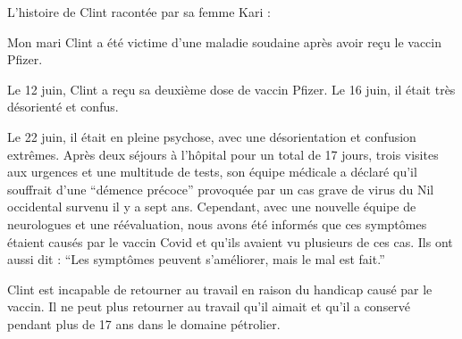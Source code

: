 L'histoire de Clint racontée par sa femme Kari :

Mon mari Clint a été victime d'une maladie soudaine après avoir reçu le vaccin
Pfizer.

Le 12 juin, Clint a reçu sa deuxième dose de vaccin Pfizer. Le 16 juin, il était
très désorienté et confus.

Le 22 juin, il était en pleine psychose, avec une désorientation et confusion
extrêmes. Après deux séjours à l'hôpital pour un total de 17 jours, trois
visites aux urgences et une multitude de tests, son équipe médicale a déclaré
qu'il souffrait d'une “démence précoce” provoquée par un cas grave de virus du
Nil occidental survenu il y a sept ans. Cependant, avec une nouvelle équipe de
neurologues et une réévaluation, nous avons été informés que ces symptômes
étaient causés par le vaccin Covid et qu'ils avaient vu plusieurs de ces
cas. Ils ont aussi dit : “Les symptômes peuvent s'améliorer, mais le mal est
fait.”

Clint est incapable de retourner au travail en raison du handicap causé par le
vaccin. Il ne peut plus retourner au travail qu'il aimait et qu'il a conservé
pendant plus de 17 ans dans le domaine pétrolier.
